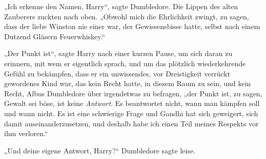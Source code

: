 „Ich erkenne den Namen, Harry“, sagte Dumbledore. Die Lippen des alten Zauberers zuckten nach oben. „Obwohl mich die Ehrlichkeit zwingt, zu sagen, dass der liebe Winston nie einer war, der Gewissensbisse hatte, selbst nach einem Dutzend Gläsern Feuerwhiskey.“

„Der Punkt ist“, sagte Harry nach einer kurzen Pause, um sich daran zu erinnern, mit wem er eigentlich sprach, und um das plötzlich wiederkehrende Gefühl zu bekämpfen, dass er ein unwissendes, vor Dreistigkeit verrückt gewordenes Kind war, das kein Recht hatte, in diesem Raum zu sein, und kein Recht, Albus Dumbledore über irgendetwas zu befragen, „der Punkt ist, zu sagen, Gewalt sei böse, ist keine \emph{Antwort}. Es beantwortet nicht, wann man kämpfen soll und wann nicht. Es ist eine schwierige Frage und Gandhi hat sich geweigert, sich damit auseinanderzusetzen, und deshalb habe ich einen Teil meines Respekts vor ihm verloren.“

„Und deine eigene Antwort, Harry?“ Dumbledore sagte leise.

